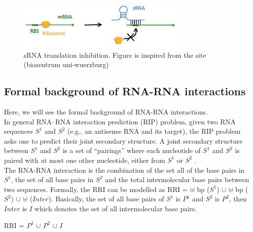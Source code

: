 \documentclass[twoside,a4paper]{report}
\numberwithin{equation}{section}
\begin{document}
 	
 	 \begin{figure}[tb]
 		\includegraphics[width=0.8\linewidth]{srna}
 		\centering
 		\caption{sRNA translation inhibition. Figure is inspired from the site (biozentrum uni-wuerzburg)\\}
 		\label{fig:srna}
 	\end{figure}
 	
 	
 	\subsection{Formal background of RNA-RNA interactions}
 	Here, we will see the formal background of RNA-RNA interactions.\\
 	In general RNA–RNA interaction prediction (RIP) problem, given two RNA sequences $S^1$ and $S^2$ (e.g., an antisense RNA and its target), the RIP problem asks one to predict their joint secondary structure. A joint secondary structure between $S^1$ and $S^2$ is a set of “pairings” where each nucleotide of $S^1$ and $S^2$ is paired with at most one other nucleotide, either from $S^1$ or $S^2$ \citep{alkan2006rna}.  \\
 	
 	The RNA-RNA interaction is the combination of the set all of the base pairs in $S^1$, the set of all base pairs in $S^2$ and the total intermolecular base pairs between two sequences. Formally, the RRI can be modelled as RRI = $ \uplus $ bp ($S^1$) $ \cup $ $\uplus$ bp ($S^2$) $\cup$ $\uplus$ ($Inter$). Basically, the set of all base pairs of $S^1$ is $P^1$ and $S^2$ is $P^2$, then $Inter$ is $I$ which denotes the set of all intermolecular base pairs. \\
 	
 		\begin{center}
 		RRI =  $P^1$ $ \cup $  $P^2$ $\cup$ $I$
 		\end{center}
 	
\end{document}
